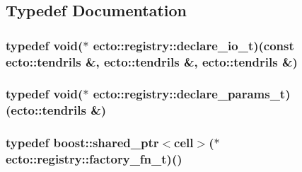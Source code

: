 \subsection{\-Typedef \-Documentation}
\hypertarget{namespaceecto_1_1registry_af52d8f0fff3baaf352e2523ab8ed7977}{
\subsubsection[{declare\-\_\-io\-\_\-t}]{\setlength{\rightskip}{0pt plus 5cm}typedef void($\ast$ {\bf ecto\-::registry\-::declare\-\_\-io\-\_\-t})(const {\bf ecto\-::tendrils} \&, {\bf ecto\-::tendrils} \&, {\bf ecto\-::tendrils} \&)}}\label{namespaceecto_1_1registry_af52d8f0fff3baaf352e2523ab8ed7977}
\hypertarget{namespaceecto_1_1registry_a04d849b45313a8ce9a602095e1edade9}{
\subsubsection[{declare\-\_\-params\-\_\-t}]{\setlength{\rightskip}{0pt plus 5cm}typedef void($\ast$ {\bf ecto\-::registry\-::declare\-\_\-params\-\_\-t})({\bf ecto\-::tendrils} \&)}}\label{namespaceecto_1_1registry_a04d849b45313a8ce9a602095e1edade9}
\hypertarget{namespaceecto_1_1registry_a3f75a16f135bcadb9bf1a7000b807b3b}{
\subsubsection[{factory\-\_\-fn\-\_\-t}]{\setlength{\rightskip}{0pt plus 5cm}typedef boost\-::shared\-\_\-ptr$<${\bf cell}$>$($\ast$ {\bf ecto\-::registry\-::factory\-\_\-fn\-\_\-t})()}}\label{namespaceecto_1_1registry_a3f75a16f135bcadb9bf1a7000b807b3b}



